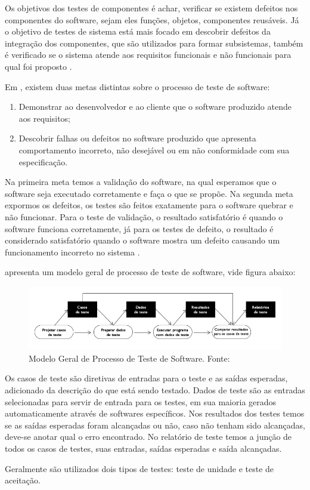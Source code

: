\documentclass[pnumabnt,normaltoc,espacoumemeio,capchap]{abnt}
\begin{document}
\par Os objetivos dos testes de componentes é achar, verificar se existem defeitos nos componentes do software, sejam eles funções, objetos, componentes reusáveis. Já o objetivo de testes de sistema está mais focado em descobrir defeitos da integração dos componentes, que são utilizados para formar subsistemas, também é verificado se o sistema atende aos requisitos funcionais e não funcionais para qual foi proposto \cite{SV07}.
\par Em , existem duas metas distintas sobre o processo de teste de software:
\begin{enumerate}
	\item Demonstrar ao desenvolvedor e ao cliente que o software produzido atende aos requisitos;
	\item Descobrir falhas ou defeitos no software produzido que apresenta comportamento incorreto, não desejável ou em não conformidade com sua especificação.
\end{enumerate}
\par Na primeira meta temos a validação do software, na qual esperamos que o software seja executado corretamente e faça o que se propõe. Na segunda meta expormos os defeitos, os testes são feitos exatamente para o software quebrar e não funcionar. Para o teste de validação, o resultado satisfatório é quando o software funciona corretamente, já para os testes de defeito, o resultado é considerado satisfatório quando o software mostra um defeito causando um funcionamento incorreto no sistema \cite{SV07}.
\par {} apresenta um modelo geral de processo de teste de software, vide figura abaixo:
\begin{figure}[htbp]
	\centering
	\caption{Modelo Geral de Processo de Teste de Software\label{fig:f2}. Fonte: }
	\includegraphics[width=16cm,scale=1]{images/f2.png}
\end{figure}
\par Os casos de teste são diretivas de entradas para o teste e as saídas esperadas, adicionado da descrição do que está sendo testado. Dados de teste são as entradas selecionadas para servir de entrada para os testes, em sua maioria gerados automaticamente através de softwares específicos. Nos resultados dos testes temos se as saídas esperadas foram alcançadas ou não, caso não tenham sido alcançadas, deve-se anotar qual o erro encontrado. No relatório de teste temos a junção de todos os casos de testes, suas entradas, saídas esperadas e saída alcançadas.
\par Geralmente são utilizados dois tipos de testes: teste de unidade e teste de aceitação.
\end{document}
